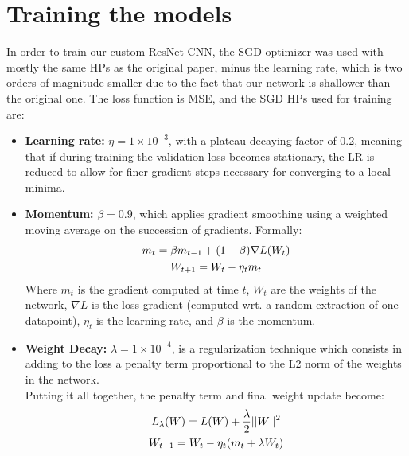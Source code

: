 
\section{Training the models} %
In order to train our custom ResNet CNN, the SGD optimizer was used with mostly the same HPs as the original paper, minus the learning rate, which is two orders of magnitude smaller due to the fact that our network is shallower than the original one. The loss function is MSE, and the SGD HPs used for training are:
\begin{itemize}
    \item \textbf{Learning rate:} $\eta =1\times 10^{-3}$, with a plateau decaying factor of 0.2, meaning that if during training the validation loss becomes stationary, the LR is reduced to allow for finer gradient steps necessary for converging to a local minima.
    \item \textbf{Momentum:} $\beta = 0.9$, which applies gradient smoothing using a weighted moving average on the succession of gradients. Formally:
    \begin{equation*}
    \centering
        \begin{gathered}
        m_t = \beta m_{t-1} + (1-\beta)\nabla L(W_t)  \\
        W_{t+1} = W_t - \eta_t m_t\\
        \end{gathered}
    \end{equation*}
    Where $m_t$ is the gradient computed at time $t$, $W_t$ are the weights of the network, $\nabla L$ is the loss gradient (computed wrt. a random extraction of one datapoint), $\eta_t$ is the learning rate, and $\beta$ is the momentum.
    \item \textbf{Weight Decay:} $\lambda =1\times10^{-4}$, is a regularization technique which consists in adding to the loss a penalty term proportional to the L2 norm of the weights in the network.\\
    Putting it all together, the penalty term and final weight update become:
    \begin{equation*}
    \centering
        \begin{gathered}
        L_{\lambda}(W) = L(W) + \frac{\lambda}{2}||W||^2  \\
        W_{t+1} = W_t - \eta_t (m_t +\lambda W_t)\\
        \end{gathered}
    \end{equation*}
     
\end{itemize}

